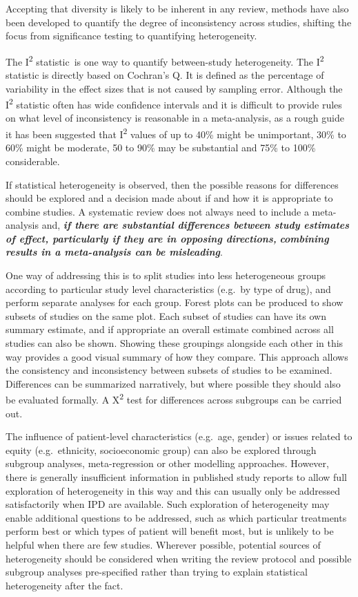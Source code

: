 \documentclass[
  11pt,
  a4paper,
  DIV=11,
  numbers=noendperiod]{scrreprt}
\begin{document}
Accepting that diversity is likely to be inherent in any review, methods
have also been developed to quantify the degree of inconsistency across
studies, shifting the focus from significance testing to quantifying
heterogeneity.

The I\textsuperscript{2} statistic~is one way to quantify between-study
heterogeneity. The I\textsuperscript{2} statistic is directly based on
Cochran's Q. It is defined as the percentage of variability in the
effect sizes that is not caused by sampling error. Although the
I\textsuperscript{2} statistic often has wide confidence intervals and
it is difficult to provide rules on what level of inconsistency is
reasonable in a meta-analysis, as a rough guide it has been suggested
that I\textsuperscript{2} values of up to 40\% might be unimportant,
30\% to 60\% might be moderate, 50 to 90\% may be substantial and 75\%
to 100\% considerable.

If statistical heterogeneity is observed, then the possible reasons for
differences should be explored and a decision made about if and how it
is appropriate to combine studies. A systematic review does not always
need to include a meta-analysis and, \textbf{\emph{if there are
substantial differences between study estimates of effect, particularly
if they are in opposing directions,}} \textbf{\emph{combining results in
a meta-analysis can be misleading}}.

One way of addressing this is to split studies into less heterogeneous
groups according to particular study level characteristics (e.g.~by type
of drug), and perform separate analyses for each group. Forest plots can
be produced to show subsets of studies on the same plot. Each subset of
studies can have its own summary estimate, and if appropriate an overall
estimate combined across all studies can also be shown. Showing these
groupings alongside each other in this way provides a good visual
summary of how they compare. This approach allows the consistency and
inconsistency between subsets of studies to be examined. Differences can
be summarized narratively, but where possible they should also be
evaluated formally. A X\textsuperscript{2} test for differences across
subgroups can be carried out.

The influence of patient-level characteristics (e.g.~age, gender) or
issues related to equity (e.g.~ethnicity, socioeconomic group) can also
be explored through subgroup analyses, meta-regression or other
modelling approaches. However, there is generally insufficient
information in published study reports to allow full exploration of
heterogeneity in this way and this can usually only be addressed
satisfactorily when IPD are available. Such exploration of heterogeneity
may enable additional questions to be addressed, such as which
particular treatments perform best or which types of patient will
benefit most, but is unlikely to be helpful when there are few studies.
Wherever possible, potential sources of heterogeneity should be
considered when writing the review protocol and possible subgroup
analyses pre-specified rather than trying to explain statistical
heterogeneity after the fact.
\end{document}
